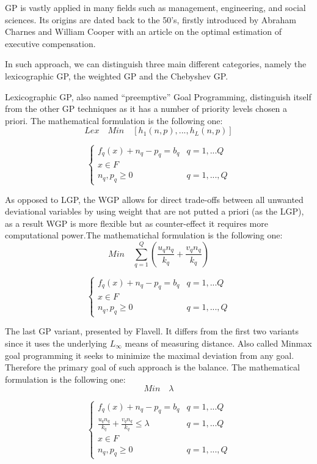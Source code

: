 \documentclass{article}
\begin{document}
GP is vastly applied in many fields\cite{tamiz_goal_1998} such as management, engineering, and social sciences. Its origins are dated back to the 50's, firstly introduced by Abraham Charnes and William Cooper\cite{charnes_optimal_1955} with an article on the optimal estimation of executive compensation.

In such approach, we can distinguish three main different categories, namely the lexicographic GP, the weighted GP and the Chebyshev GP.

Lexicographic GP, also named “preemptive” Goal Programming, distinguish itself from the other GP techniques as it has a number of priority levels chosen a priori. The mathematical formulation is the following one:
\[
Lex \quad Min \quad [h_1(n,p),...,h_L(n,p)]
\]

\[
\begin{cases}
f_q(x)+n_q-p_q=b_q & q=1,...Q
\\
x\in F
\\
n_q,p_q\geq0 & q=1,...,Q
\end{cases}
\]

As opposed to LGP, the WGP allows for direct trade-offs between all unwanted deviational variables by using weight that are not putted a priori (as the LGP), as a result WGP is more flexible but as counter-effect it requires more computational power.The mathematichal formulation is the following one:
\[
Min \quad \sum_{q=1}^{Q}(\frac{u_q n_q}{k_q}+\frac{v_q n_q}{k_q})
\]

\[
\begin{cases}
f_q(x)+n_q-p_q=b_q & q=1,...Q
\\
x\in F
\\
n_q,p_q\geq0 & q=1,...,Q
\end{cases}
\]

The last GP variant, presented by Flavell. It differs from the first two variants since it uses the underlying $ L_\infty $ means of measuring distance. Also called Minmax goal programming it seeks to minimize the maximal deviation from any goal. Therefore the primary goal of such approach is the balance. The mathematical formulation is the following one:
\[
Min \quad \lambda
\]

\[
\begin{cases}
f_q(x)+n_q-p_q=b_q & q=1,...Q
\\
\frac{u_q n_q}{k_q}+\frac{v_q n_q}{k_q}\leq\lambda & q=1,...Q
\\
x\in F
\\
n_q,p_q\geq0 & q=1,...,Q
\end{cases}
\]
\end{document}
